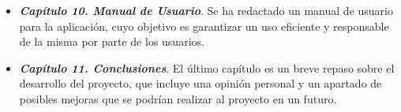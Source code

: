 \begin{itemize}
    \item \textbf{\emph{Capítulo 10. Manual de Usuario}}. Se ha redactado 
    un manual de usuario para la aplicación, cuyo objetivo es garantizar un 
    uso eficiente y responsable de la misma por parte de los usuarios. 
    
    \item \textbf{\emph{Capítulo 11. Conclusiones}}. El último capítulo es 
    un breve repaso sobre el desarrollo del proyecto, que incluye una 
    opinión personal y un apartado de posibles mejoras que se podrían 
    realizar al proyecto en un futuro.
\end{itemize}
